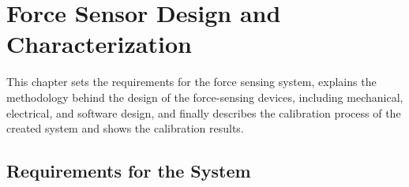 \chapter{Force Sensor Design and Characterization}
\label{sen_des_char} %
This chapter sets the requirements for the force sensing system, explains the methodology behind the design of the force-sensing devices, including mechanical, electrical, and software design, and finally describes the calibration process of the created system and shows the calibration results. 

\section{Requirements for the System}
	\label{sec:DevReq}
		
